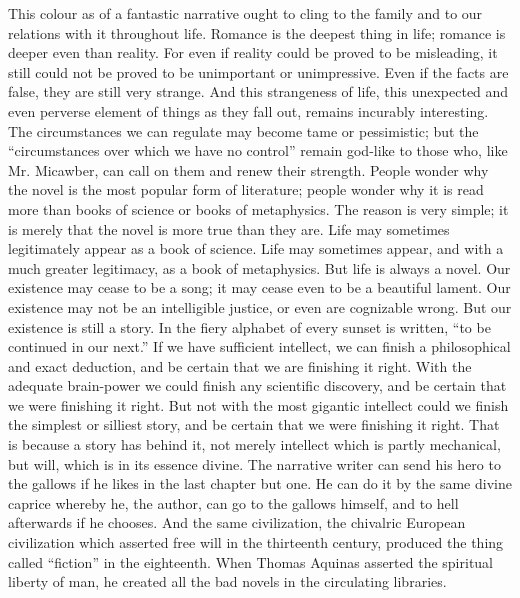 This colour as of a fantastic narrative ought to cling to the family and to our relations with it throughout life. Romance is the deepest thing in life; romance is deeper even than reality. For even if reality could be proved to be misleading, it still could not be proved to be unimportant or unimpressive. Even if the facts are false, they are still very strange. And this strangeness of life, this unexpected and even perverse element of things as they fall out, remains incurably interesting. The circumstances we can regulate may become tame or pessimistic; but the “circumstances over which we have no control” remain god-like to those who, like Mr. Micawber, can call on them and renew their strength. People wonder why the novel is the most popular form of literature; people wonder why it is read more than books of science or books of metaphysics. The reason is very simple; it is merely that the novel is more true than they are. Life may sometimes legitimately appear as a book of science. Life may sometimes appear, and with a much greater legitimacy, as a book of metaphysics. But life is always a novel. Our existence may cease to be a song; it may cease even to be a beautiful lament. Our existence may not be an intelligible justice, or even are cognizable wrong. But our existence is still a story. In the fiery alphabet of every sunset is written, “to be continued in our next.” If we have sufficient intellect, we can finish a philosophical and exact deduction, and be certain that we are finishing it right. With the adequate brain-power we could finish any scientific discovery, and be certain that we were finishing it right. But not with the most gigantic intellect could we finish the simplest or silliest story, and be certain that we were finishing it right. That is because a story has behind it, not merely intellect which is partly mechanical, but will, which is in its essence divine. The narrative writer can send his hero to the gallows if he likes in the last chapter but one. He can do it by the same divine caprice whereby he, the author, can go to the gallows himself, and to hell afterwards if he chooses. And the same civilization, the chivalric European civilization which asserted free will in the thirteenth century, produced the thing called “fiction” in the eighteenth. When Thomas Aquinas asserted the spiritual liberty of man, he created all the bad novels in the circulating libraries.

